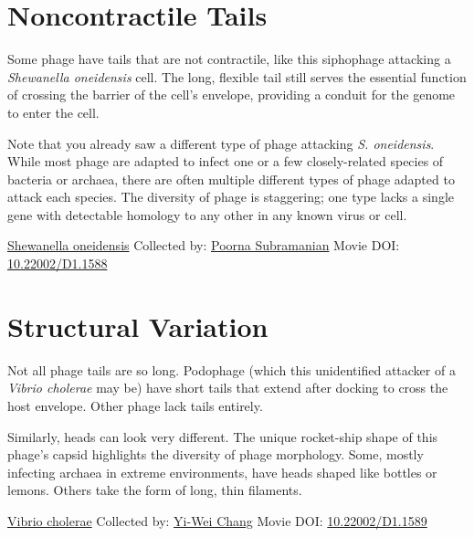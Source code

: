 \documentclass[]{tufte-book}
\begin{document}
\hypertarget{noncontractile-tails}{%
\section{Noncontractile Tails}\label{noncontractile-tails}}

Some phage have tails that are not contractile, like this siphophage attacking a \emph{Shewanella oneidensis} cell. The long, flexible tail still serves the essential function of crossing the barrier of the cell's envelope, providing a conduit for the genome to enter the cell.

Note that you already saw a different type of phage attacking \emph{S. oneidensis}. While most phage are adapted to infect one or a few closely-related species of bacteria or archaea, there are often multiple different types of phage adapted to attack each species. The diversity of phage is staggering; one type lacks a single gene with detectable homology to any other in any known virus or cell.



\hypertarget{htmlwidget-d46451d8f4ec9ced7eeb}{}

\label{fig:10-3}\protect\hyperlink{tree}{Shewanella oneidensis} Collected by: \protect\hyperlink{poorna_subramanian}{Poorna Subramanian} Movie DOI: \href{https://doi.org/10.22002/D1.1588}{10.22002/D1.1588}

\hypertarget{structural-variation}{%
\section{Structural Variation}\label{structural-variation}}

Not all phage tails are so long. Podophage (which this unidentified attacker of a \emph{Vibrio cholerae} may be) have short tails that extend after docking to cross the host envelope. Other phage lack tails entirely.

Similarly, heads can look very different. The unique rocket-ship shape of this phage's capsid highlights the diversity of phage morphology. Some, mostly infecting archaea in extreme environments, have heads shaped like bottles or lemons. Others take the form of long, thin filaments.



\hypertarget{htmlwidget-17cac1e6bec3df656763}{}

\label{fig:10-4}\protect\hyperlink{tree}{Vibrio cholerae} Collected by: \protect\hyperlink{yi-wei_chang}{Yi-Wei Chang} Movie DOI: \href{https://doi.org/10.22002/D1.1589}{10.22002/D1.1589}
\end{document}
